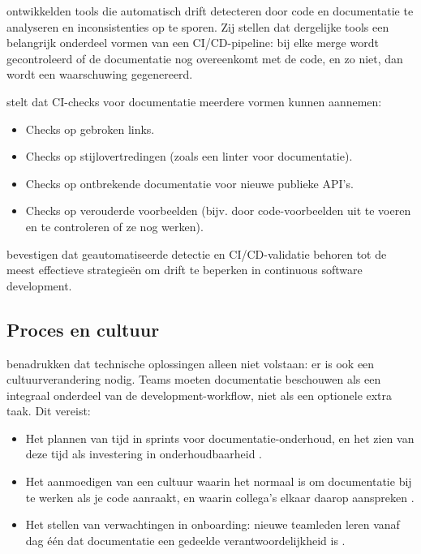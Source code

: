 \textcite{romeo2024didrift} ontwikkelden tools die automatisch drift detecteren door code en documentatie te analyseren en inconsistenties op te sporen. Zij stellen dat dergelijke tools een belangrijk onderdeel vormen van een CI/CD-pipeline: bij elke merge wordt gecontroleerd of de documentatie nog overeenkomt met de code, en zo niet, dan wordt een waarschuwing gegenereerd.

\textcite{gentle2017docslikecode} stelt dat CI-checks voor documentatie meerdere vormen kunnen aannemen:

\begin{itemize}
    \item Checks op gebroken links.
    \item Checks op stijlovertredingen (zoals een linter voor documentatie).
    \item Checks op ontbrekende documentatie voor nieuwe publieke API's.
    \item Checks op verouderde voorbeelden (bijv. door code-voorbeelden uit te voeren en te controleren of ze nog werken).
\end{itemize}

\textcite{theunissen2022mappingdocumentation} bevestigen dat geautomatiseerde detectie en CI/CD-validatie behoren tot de meest effectieve strategieën om drift te beperken in continuous software development.
\subsection{Proces en cultuur}
\textcite{bhatti2021docsdevelopers} benadrukken dat technische oplossingen alleen niet volstaan: er is ook een cultuurverandering nodig. Teams moeten documentatie beschouwen als een integraal onderdeel van de development-workflow, niet als een optionele extra taak. Dit vereist:

\begin{itemize}
    \item Het plannen van tijd in sprints voor documentatie-onderhoud, en het zien van deze tijd als investering in onderhoudbaarheid \autocite{tripathy2014softwareevolution}.
    \item Het aanmoedigen van een cultuur waarin het normaal is om documentatie bij te werken als je code aanraakt, en waarin collega's elkaar daarop aanspreken \autocite{gentle2017docslikecode}.
    \item Het stellen van verwachtingen in onboarding: nieuwe teamleden leren vanaf dag één dat documentatie een gedeelde verantwoordelijkheid is \autocite{bhatti2021docsdevelopers}.
\end{itemize}

